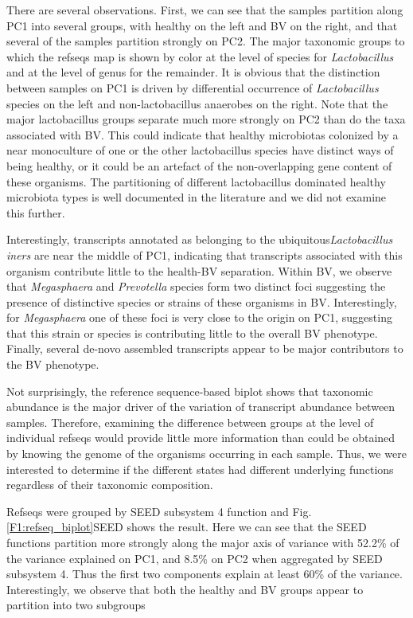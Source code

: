\documentclass[10pt,letterpaper]{article}
\begin{document}
There are several observations. First, we can see that the samples partition along PC1 into several groups, with healthy on the left and BV on the right, and that several of the samples partition strongly on PC2. The major taxonomic groups to which the refseqs map is shown by color at the level of species for \emph{Lactobacillus} and at the level of genus for the remainder. It is obvious that the distinction between samples on  PC1 is driven by differential occurrence of \emph{Lactobacillus} species on the left and non-lactobacillus anaerobes on the right. Note that the major lactobacillus groups separate much more strongly on PC2 than do the taxa associated with BV. This could indicate that healthy microbiotas colonized by a near monoculture of one or the other lactobacillus species have distinct ways of being healthy, or it could be an artefact of the non-overlapping gene content of these organisms. The partitioning of different lactobacillus dominated healthy microbiota types is well documented in the literature \cite{Ravel:2010, Hummelen:2010,mcmillan:2015}   and we did not examine this further. 

Interestingly, transcripts annotated as belonging to the ubiquitous\emph{Lactobacillus iners} are near the middle of PC1, indicating that transcripts associated with this organism contribute little to the health-BV separation.  Within BV, we observe that \emph{Megasphaera} and \emph{Prevotella} species form two distinct foci suggesting the presence of distinctive species or strains of these organisms in BV. Interestingly, for \emph{Megasphaera} one of these foci is very close to the origin on PC1, suggesting that this strain or species is contributing little to the overall BV phenotype. Finally, several de-novo assembled transcripts appear to be major contributors to the BV phenotype.

Not surprisingly, the reference sequence-based biplot shows that taxonomic abundance is the major driver of the variation of transcript abundance between samples. Therefore, examining the difference between groups at the level of individual refseqs would provide little more information than could be obtained by knowing the genome of the organisms occurring in each sample. Thus, we were interested to determine if the different states had different underlying functions regardless of their taxonomic composition. 

Refseqs were grouped by SEED subsystem 4 function \cite{Aziz:2008} and Fig. \ref{F1:refseq_biplot}SEED shows the result.  Here we can see that the SEED functions partition more strongly along the major axis of variance with 52.2\% of the variance explained on PC1, and 8.5\% on PC2 when aggregated by SEED subsystem 4.  Thus the first two components explain at least 60\% of the variance. Interestingly, we observe that both the healthy and BV groups appear to partition into two subgroups
\end{document}
